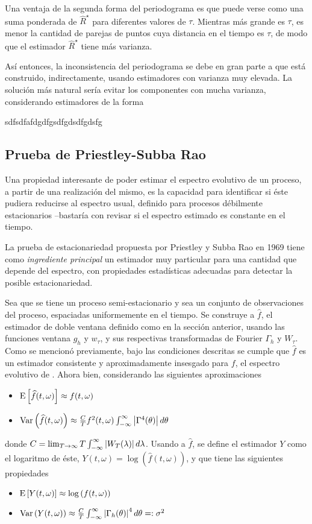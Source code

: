 Una ventaja de la segunda forma del periodograma es que puede verse como una suma ponderada de 
$\widehat{R}^{\star}$ para diferentes valores de $\tau$. 
Mientras más grande es $\tau$, es menor la cantidad de parejas de puntos cuya distancia en el 
tiempo es $\tau$, de modo que el estimador $\widehat{R}^{\star}$ tiene más varianza. 

Así entonces, la inconsistencia del periodograma se debe en gran parte a que está construido,
indirectamente, usando estimadores con varianza muy elevada.
La solución más natural sería evitar los componentes con mucha varianza, considerando estimadores de 
la forma

sdfsdfafdgdfgsdfgdsdfgdsfg



\subsection{Prueba de Priestley-Subba Rao}

Una propiedad interesante de poder estimar el espectro evolutivo de un proceso, a partir de una 
realización del mismo, es la capacidad para identificar si éste pudiera reducirse al espectro 
usual, definido para procesos débilmente estacionarios --bastaría con revisar si el espectro 
estimado es constante en el tiempo.

La prueba de estacionariedad propuesta por Priestley y Subba Rao en 1969 \cite{Priestley69} tiene 
como \textit{ingrediente principal} un estimador muy particular para una cantidad que depende del 
espectro, con propiedades estadísticas adecuadas para detectar la posible estacionariedad.

Sea \xt que se tiene un proceso semi-estacionario y sea \xtd un conjunto de observaciones del 
proceso, espaciadas uniformemente en el tiempo.
Se construye a $\widehat{f}$, el estimador de doble ventana definido como en la sección anterior,
usando las funciones ventana $g_h$ y $w_\tau$, y sus respectivas transformadas de Fourier 
$\Gamma_h$ y $W_\tau$. Como se mencionó previamente, bajo las condiciones descritas se cumple que 
$\widehat{f}$ es un estimador consistente y aproximadamente insesgado para $f$, el espectro
evolutivo de \xt. Ahora bien, considerando las siguientes aproximaciones
%
\begin{itemize}
\item $\mathrm{E}\left[ \widehat{f}(t,\omega) \right] \approx f(t,\omega)$
\item $\mathrm{Var}\left( \widehat{f}(t,\omega) \right) \approx 
\frac{C}{T} f^{2}(t,\omega) \int_{-\infty}^{\infty} \left| \Gamma^{4}(\theta) \right| d\theta$
\end{itemize}
%
donde $C = \lim_{T\rightarrow \infty} T \int_{-\infty}^{\infty} \left| W_T(\lambda) \right| d\lambda$.
Usando a $\widehat{f}$, se define el estimador $Y$ como el logaritmo de éste, 
$Y(t,\omega) = \log\left(\widehat{f}(t,\omega)\right)$, y que tiene las siguientes propiedades
%
\begin{itemize}
\item $\mathrm{E}\left[ Y(t,\omega) \right] \approx \log\left(f(t,\omega)\right)$
\item $\mathrm{Var}\left( Y(t,\omega) \right) \approx 
\frac{C}{T} \int_{-\infty}^{\infty} \left| \Gamma_h(\theta) \right|^{4} d\theta =: \sigma^{2}$
\end{itemize}
%

